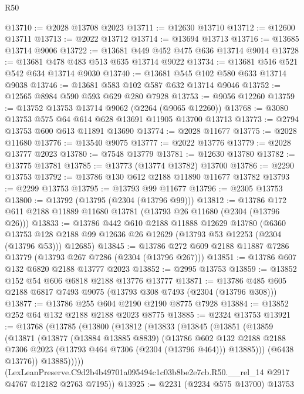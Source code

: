 \begin{lexlean}{R50}
\begin{coremodule}
@13710 := @2028 @13708 @2023
@13711 := @12630 @13710
@13712 := @12600 @13711
@13713 := @2022 @13712
@13714 := @13694 @13713
@13716 := @13685 @13714 @9006
@13722 := @13681 @449 @452 @475 @636 @13714 @9014
@13728 := @13681 @478 @483 @513 @635 @13714 @9022
@13734 := @13681 @516 @521 @542 @634 @13714 @9030
@13740 := @13681 @545 @102 @580 @633 @13714 @9038
@13746 := @13681 @583 @102 @587 @632 @13714 @9046
@13752 := @12565 @8984 @590 @593 @629 @280 @7928
@13753 := @9056 @12260
@13759 := @13752 @13753 @13714 @9062 (@2264 (@9065 @12260))
@13768 := @3080 @13753 @575 @64 @614 @628 @13691 @11905 @13700 @13713
@13773 := @2794 @13753 @600 @613 @11891 @13690
@13774 := @2028 @11677
@13775 := @2028 @11680
@13776 := @13540 @9075
@13777 := @2022 @13776
@13779 := @2028 @13777 @2023
@13780 := @7548 @13779
@13781 := @12630 @13780
@13782 := @13775 @13781
@13785 := @13773 (@13774 @13782) @13700
@13786 := @2290 @13753
@13792 := @13786 @130 @612 @2188 @11890 @11677 @13782
@13793 := @2299 @13753
@13795 := @13793 @99 @11677
@13796 := @2305 @13753
@13800 := @13792 (@13795 (@2304 (@13796 @99)))
@13812 := @13786 @172 @611 @2188 @11889 @11680 @13781 (@13793 @26 @11680 (@2304 (@13796 @26)))
@13833 := @13786
    @442
    @610
    @2188
    @11888
    @12629
    @13780
    (@6360 @13753 @128 @2188 @99 @12636 @26 @12629 (@13793 @53 @12253 (@2304 (@13796 @53))) @12685)
@13845 := @13786 @272 @609 @2188 @11887 @7286 @13779 (@13793 @267 @7286 (@2304 (@13796 @267)))
@13851 := @13786 @607 @132 @6820 @2188 @13777 @2023
@13852 := @2995 @13753
@13859 := @13852 @152 @54 @606 @6818 @2188 @13776 @13777
@13871 := @13786 @485 @605 @2188 @6817 @7493 @9075 (@13793 @308 @7493 (@2304 (@13796 @308)))
@13877 := @13786 @255 @604 @2190 @2190 @8775 @7928
@13884 := @13852 @252 @64 @132 @2188 @2188 @2023 @8775
@13885 := @2324 @13753
@13921 := @13768
    (@13785
      (@13800
        (@13812
          (@13833
            (@13845
              (@13851
                (@13859
                  (@13871
                    (@13877
                      (@13884 @13885 @8839)
                      (@13786
                        @602
                        @132
                        @2188
                        @2188
                        @7306
                        @2023
                        (@13793 @464 @7306 (@2304 (@13796 @464)))
                        @13885)))
                  (@6438 @13776))
                @13885)))))
      (LexLeanPreserve.C9d2b4b49701a095494c1c03b8be2e7cb.R50.__rel_14
        @2917
        @4767
        @12182
        @2763
        @7195))
@13925 := @2231 (@2234 @575 @13700) @13753

\end{coremodule}
\end{lexlean}
